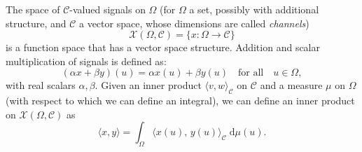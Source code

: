 \begin{tcolorbox}[width=\linewidth,
                  boxsep=0pt,
                  left=7.5pt,
                  right=7.5pt,
                  top=7.5pt,
                  bottom=7.5pt,
                  arc=0pt,
                  boxrule=0pt,toprule=0pt,
                  colback=boxgray,
                  ]%

The space of $\mathcal{C}$-valued signals on $\Omega$ 
(for $\Omega$ a set, possibly with additional structure, and $\mathcal{C}$ a vector space, whose dimensions are called \emph{channels}) 
\begin{equation}
    \mathcal{X}(\Omega, \mathcal{C}) = \{ x : \Omega \rightarrow \mathcal{C} \}
\end{equation}
%
is a function space that has a vector space structure. 
Addition and scalar multiplication of signals is defined as:
\begin{equation*}
    (\alpha x + \beta y)(u) = \alpha x(u) + \beta y(u) \quad \text{for all} \quad u\in \Omega,
\end{equation*}
with real scalars $\alpha, \beta$. %
%
Given an inner product $\langle v, w \rangle_\mathcal{C}$ on $\mathcal{C}$ and a measure $\mu$ on $\Omega$ (with respect to which we can define an integral), we can define an inner product on $\mathcal{X}(\Omega, \mathcal{C})$ as 
\begin{equation}
    \langle x, y \rangle = \int_{\Omega} \langle x(u), \, y(u) \rangle_{\mathcal{C}} \; \mathrm{d}\mu(u).
    \label{eqn:innerprod}
\end{equation}
\end{tcolorbox}


